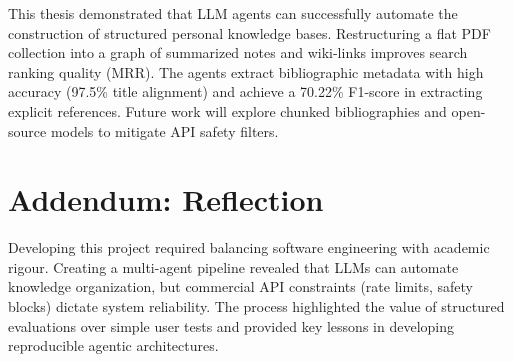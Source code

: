 \documentclass[runningheads]{llncs}
\begin{document}
This thesis demonstrated that LLM agents can successfully automate the construction of structured personal knowledge bases. Restructuring a flat PDF collection into a graph of summarized notes and wiki-links improves search ranking quality (MRR). The agents extract bibliographic metadata with high accuracy (97.5\% title alignment) and achieve a 70.22\% F1-score in extracting explicit references. Future work will explore chunked bibliographies and open-source models to mitigate API safety filters.


\section*{Addendum: Reflection}
\label{sec:reflection}

Developing this project required balancing software engineering with academic rigour. Creating a multi-agent pipeline revealed that LLMs can automate knowledge organization, but commercial API constraints (rate limits, safety blocks) dictate system reliability. The process highlighted the value of structured evaluations over simple user tests and provided key lessons in developing reproducible agentic architectures.




\end{document}
